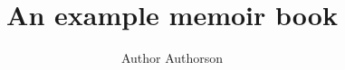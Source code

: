 \documentclass[10pt,twoside,onecolumn,openright]{memoir}
\title{An example memoir book}
\author{Author Authorson}
\date{}
\begin{document}
	\the\xlvchars\par
	\blinddocument
    \frontmatter
        
        
        
        
        \cleardoublepage
        \tableofcontents*
    \mainmatter
            
            
    \backmatter
\end{document}
